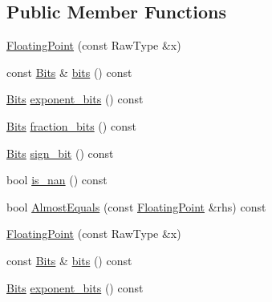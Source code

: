 \subsection*{\-Public \-Member \-Functions}
\begin{DoxyCompactItemize}
\item 
\hyperlink{classtesting_1_1internal_1_1FloatingPoint_ae571da332db90c7d19af0158780d9a1b}{\-Floating\-Point} (const \-Raw\-Type \&x)
\item 
const \hyperlink{classtesting_1_1internal_1_1FloatingPoint_adb12c064e30491d4976393880f9dca27}{\-Bits} \& \hyperlink{classtesting_1_1internal_1_1FloatingPoint_a4f9cc005ccb696e23e467f87a3a0a5ce}{bits} () const 
\item 
\hyperlink{classtesting_1_1internal_1_1FloatingPoint_adb12c064e30491d4976393880f9dca27}{\-Bits} \hyperlink{classtesting_1_1internal_1_1FloatingPoint_a85cf3eff61467752e9c9bb37b13462e2}{exponent\-\_\-bits} () const 
\item 
\hyperlink{classtesting_1_1internal_1_1FloatingPoint_adb12c064e30491d4976393880f9dca27}{\-Bits} \hyperlink{classtesting_1_1internal_1_1FloatingPoint_a1cc86cf7a384f5dfad4c4b74c3143095}{fraction\-\_\-bits} () const 
\item 
\hyperlink{classtesting_1_1internal_1_1FloatingPoint_adb12c064e30491d4976393880f9dca27}{\-Bits} \hyperlink{classtesting_1_1internal_1_1FloatingPoint_a7cbf434c7346c7162fb4897a3442dca9}{sign\-\_\-bit} () const 
\item 
bool \hyperlink{classtesting_1_1internal_1_1FloatingPoint_af95a0f6598aec42778acb7c86ef6acf2}{is\-\_\-nan} () const 
\item 
bool \hyperlink{classtesting_1_1internal_1_1FloatingPoint_aa4df645ea2a32d6baa212f1e43115010}{\-Almost\-Equals} (const \hyperlink{classtesting_1_1internal_1_1FloatingPoint}{\-Floating\-Point} \&rhs) const 
\item 
\hyperlink{classtesting_1_1internal_1_1FloatingPoint_ae571da332db90c7d19af0158780d9a1b}{\-Floating\-Point} (const \-Raw\-Type \&x)
\item 
const \hyperlink{classtesting_1_1internal_1_1FloatingPoint_adb12c064e30491d4976393880f9dca27}{\-Bits} \& \hyperlink{classtesting_1_1internal_1_1FloatingPoint_a4f9cc005ccb696e23e467f87a3a0a5ce}{bits} () const 
\item 
\hyperlink{classtesting_1_1internal_1_1FloatingPoint_adb12c064e30491d4976393880f9dca27}{\-Bits} \hyperlink{classtesting_1_1internal_1_1FloatingPoint_a85cf3eff61467752e9c9bb37b13462e2}{exponent\-\_\-bits} () const 
\item 

\end{DoxyCompactItemize}
